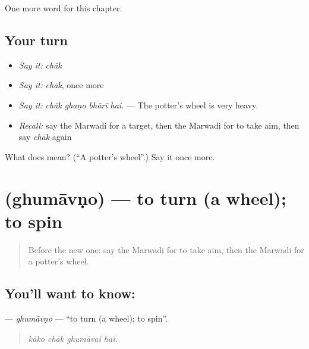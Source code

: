 \begin{grammarlens}[title={What you've built}]
One more word for this chapter.
\end{grammarlens}

\subsection*{Your turn}
\begin{itemize}
\raggedright
  \item \emph{Say it:} \emph{chāk}
  \item \emph{Say it:} \emph{chāk}, once more
  \item \emph{Say it:} \emph{chāk ghaṇo bhārī hai.} — The potter's wheel is very heavy.
  \item \emph{Recall:} say the Marwadi for a target, then the Marwadi for to take aim, then say \emph{chāk} again
\end{itemize}

\begin{tcolorbox}[breakable,colback=teal!4,colframe=teal!35!black,title={Before you move on}]
What does  mean? (\textquotedblleft{}A potter's wheel\textquotedblright{}.) Say it once more.
\end{tcolorbox}
\section[\texorpdfstring{\mw{घुमावणो} (ghumāvṇo)}{घुमावणो (ghumāvṇo)}]{ (ghumāvṇo) — to turn (a wheel); to spin}

\label{lesson:MW-C281-ghumavno}



\begin{quote}
Before the new one: say the Marwadi for to take aim, then the Marwadi for a potter's wheel.
\end{quote}

\subsection*{You'll want to know: }
\textbf{} — \emph{ghumāvṇo} — \textquotedblleft{}to turn (a wheel); to spin\textquotedblright{}.

\begin{quote}
   
\end{quote}

\begin{quote}
\emph{kāko chāk ghumāvai hai.}
\end{quote}

